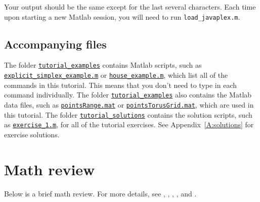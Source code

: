 \documentclass[amscd, amssymb, verbatim]{amsart}[12pt]
\theoremstyle{remark}
\theoremstyle{remark}
\theoremstyle{remark}
\begin{document}
Your output should be the same except for the last several characters. Each time upon starting a new Matlab session, you will need to run \texttt{load\_javaplex.m}.


\subsection{Accompanying files}

The folder \href{https://github.com/appliedtopology/javaplex/tree/master/src/matlab/for_distribution/tutorial_examples}{\texttt{tutorial\_examples}} contains Matlab scripts, such as \\ %
\href{https://github.com/appliedtopology/javaplex/tree/master/src/matlab/for_distribution/tutorial_examples/explicit_simplex_example.m}{\texttt{explicit\_simplex\_example.m}} or \href{https://github.com/appliedtopology/javaplex/tree/master/src/matlab/for_distribution/tutorial_examples/house_example.m}{\texttt{house\_example.m}}, which list all of the commands in this tutorial. This means that you don't need to type in each command individually. The folder \href{https://github.com/appliedtopology/javaplex/tree/master/src/matlab/for_distribution/tutorial_examples}{\texttt{tutorial\_examples}} also contains the Matlab data files, such as \href{https://github.com/appliedtopology/javaplex/tree/master/src/matlab/for_distribution/tutorial_examples/pointsRange.mat}{\texttt{pointsRange.mat}} or \href{https://github.com/appliedtopology/javaplex/tree/master/src/matlab/for_distribution/tutorial_examples/pointsTorusGrid.mat}{\texttt{pointsTorusGrid.mat}}, which are used in this tutorial. The folder \href{https://github.com/appliedtopology/javaplex/tree/master/src/matlab/for_distribution/tutorial_solutions}{\texttt{tutorial\_solutions}} contains the solution scripts, such as \href{https://github.com/appliedtopology/javaplex/tree/master/src/matlab/for_distribution/tutorial_solutions/exercise_1.m}{\texttt{exercise\_1.m}}, for all of the tutorial exercises. See Appendix~\ref{A:solutions} for exercise solutions.




\section{Math review}

Below is a brief math review. For more details, see \citet{Armstrong}, \citet{ComputationalTopology}, \citet{TopologicalPersistence}, \citet{Hatcher}, and \citet{ComputingPersistent}. 
\end{document}
